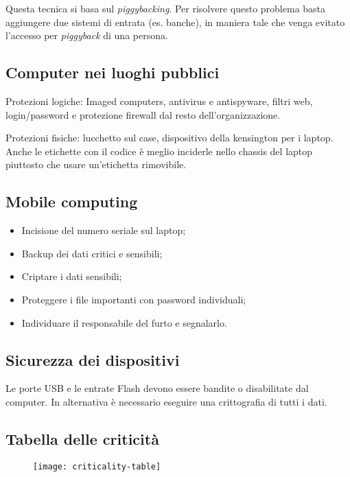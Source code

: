 Questa tecnica si basa sul \textit{piggybacking}. Per risolvere questo problema 
basta aggiungere due sistemi di entrata (es. banche), in maniera tale che venga evitato
l'accesso per \textit{piggyback} di una persona.


\subsection{Computer nei luoghi pubblici}

Protezioni logiche: Imaged computers, antivirus e antispyware, filtri web, 
login/password e protezione firewall dal resto dell'organizzazione.

Protezioni fisiche: lucchetto sul case, dispositivo della kensington per i 
laptop. Anche le etichette con il codice è meglio inciderle nello chassis del 
laptop piuttosto che usare un'etichetta rimovibile.

\subsection{Mobile computing}

\begin{itemize}
\item Incisione del numero seriale sul laptop;
\item Backup dei dati critici e sensibili;
\item Criptare i dati sensibili;
\item Proteggere i file importanti con password individuali;
\item Individuare il responsabile del furto e segnalarlo.
\end{itemize}


\subsection{Sicurezza dei dispositivi}

Le porte USB e le entrate Flash devono essere bandite o disabilitate dal 
computer. In alternativa è necessario eseguire una crittografia di tutti i dati.


\subsection{Tabella delle criticità}

\begin{figure}[H]
 \centering
 \texttt{[image: criticality-table]}
\end{figure}

